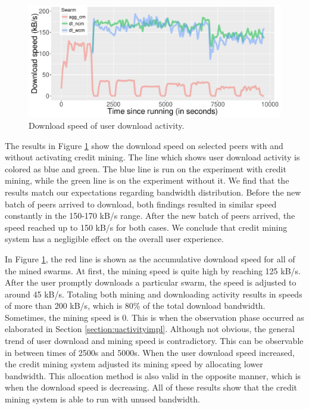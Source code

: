 \begin{figure}[h!]
		\centering
		\includegraphics[width=\textwidth]{pics/results/pr_g2-act2.pdf}
		\caption{Download speed of user download activity.}
		\label{fig:cmprio}
\end{figure}

The results in Figure \ref{fig:cmprio} show the download speed on selected peers with and without activating credit mining. The line which shows user download activity is colored as blue and green. The blue line is run on the experiment with credit mining, while the green line is on the experiment without it. We find that the results match our expectations regarding bandwidth distribution. Before the new batch of peers arrived to download, both findings resulted in similar speed constantly in the 150-170 kB/s range. After the new batch of peers arrived, the speed reached up to 150 kB/s for both cases. We conclude that credit mining system has a negligible effect on the overall user experience. 

In Figure \ref{fig:cmprio}, the red line is shown as the accumulative download speed for all of the mined swarms. At first, the mining speed is quite high by reaching 125 kB/s. After the user promptly downloads a particular swarm, the speed is adjusted to around 45 kB/s. Totaling both mining and downloading activity results in speeds of more than 200 kB/s, which is 80\% of the total download bandwidth. Sometimes, the mining speed is 0. This is when the observation phase occurred as elaborated in Section \ref{section:uactivityimpl}. Although not obvious, the general trend of user download and mining speed is contradictory. This can be observable in between times of 2500s and 5000s. When the user download speed increased, the credit mining system adjusted its mining speed by allocating lower bandwidth. This allocation method is also valid in the opposite manner, which is when the download speed is decreasing. All of these results show that the credit mining system is able to run with unused bandwidth. 


